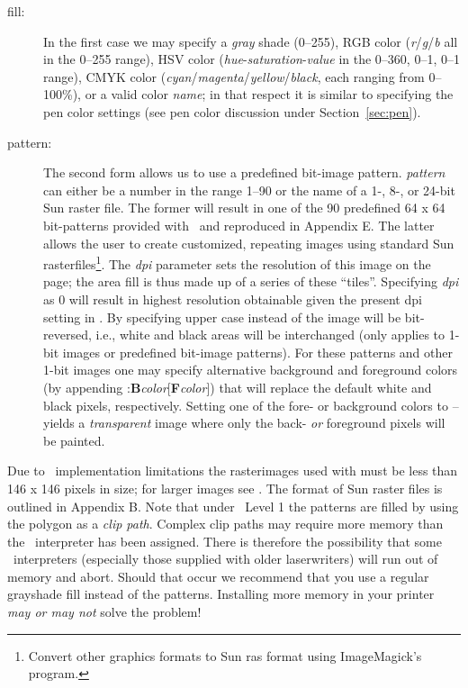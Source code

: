 \vspace{\baselineskip} 
\noindent
\begin{description}
\item [fill:]
In the first case we may specify a {\it gray} shade (0--255), RGB color
({\it r}/{\it g}/{\it b} all in the 0--255 range), HSV color ({\it hue}-{\it saturation}-{\it value}
in the 0--360, 0--1, 0--1 range), CMYK color ({\it cyan}/{\it magenta}/{\it yellow}/{\it black},
each ranging from 0--100\%), or a valid color {\it name}; in that respect it is similar
to specifying the pen color settings (see pen color discussion under Section~\ref{sec:pen}).
\item [pattern:]
The second form allows us to use a predefined bit-image pattern.
{\it pattern} can either be a number in the range 1--90 or the name of a 1-,
8-, or 24-bit Sun raster file.  The former will result in one of the 90
predefined 64 x 64 bit-patterns provided with \GMT\ and reproduced in Appendix E.
The latter allows the user to create customized, repeating images using
standard Sun rasterfiles\footnote{Convert other graphics formats to Sun ras format using
ImageMagick's  program.}.  The {\it dpi} parameter sets the resolution of
this image on the page;  the area fill is thus made up of a series of these
``tiles''.  Specifying {\it dpi} as 0 will result in highest resolution
obtainable given the present dpi setting in .
By specifying upper case  instead of  the image will be
bit-reversed, i.e., white and black areas will be interchanged (only applies
to 1-bit images or predefined bit-image patterns).  For these patterns and
other 1-bit images one may specify alternative background and foreground
colors (by appending :{\bf B}{\it color}[{\bf F}{\it color}]) that will
replace the default white and black pixels, respectively.  Setting one of the
fore- or background colors to -- yields a \emph{transparent} image where only the
back- \emph{or} foreground pixels will be painted.
\end{description}

Due to \PS\ implementation limitations the rasterimages used with
 must be less than 146 x 146 pixels in size; for larger images see
.  The format of Sun raster files is outlined in Appendix B.
Note that under \PS\ Level 1 the patterns are filled by using
the polygon as a \emph{clip path}.  Complex clip paths may require
more memory than the \PS\ interpreter has been assigned.
There is therefore the possibility that some \PS\ interpreters
(especially those supplied with older laserwriters) will run out of memory
and abort.  Should that occur we recommend that you use a regular grayshade
fill instead of the patterns.  Installing more memory in your printer
\emph{may or may not} solve the problem! 

